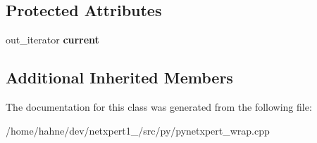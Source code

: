 \subsection*{Protected Attributes}
\begin{DoxyCompactItemize}
\item 
out\+\_\+iterator {\bfseries current}\hypertarget{classswig_1_1SwigPyIterator__T_a7b69908f19b9150a4d2b357567f8bd82}{}\label{classswig_1_1SwigPyIterator__T_a7b69908f19b9150a4d2b357567f8bd82}

\end{DoxyCompactItemize}
\subsection*{Additional Inherited Members}


The documentation for this class was generated from the following file\+:\begin{DoxyCompactItemize}
\item 
/home/hahne/dev/netxpert1\+\_/src/py/pynetxpert\+\_\+wrap.\+cpp\end{DoxyCompactItemize}
